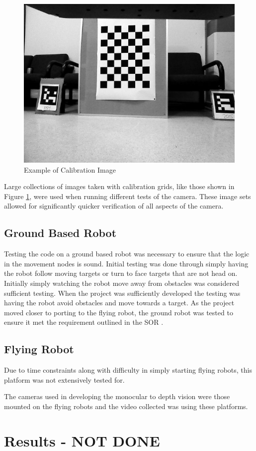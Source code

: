 \documentclass{article}[12]
\begin{document}
	\begin{figure}[]
		\centering
		\includegraphics[width=0.5\linewidth]{calibration}
		\caption{Example of Calibration Image}
		\label{fig:calbcalbcalb}
	\end{figure}
	
	Large collections of images taken with calibration grids, like those shown in Figure \ref{fig:calbcalbcalb}, were used when running different tests of the camera. These image sets allowed for significantly quicker verification of all aspects of the camera.
	
	\subsection{Ground Based Robot}
	
	Testing the code on a ground based robot was necessary to ensure that the logic in the movement nodes is sound. Initial testing was done through simply having the robot follow moving targets or turn to face targets that are not head on. Initially simply watching the robot move away from obstacles was considered sufficient testing. When the project was sufficiently developed the testing was having the robot avoid obstacles and move towards a target. As the project moved closer to porting to the flying robot, the ground robot was tested to ensure it met the requirement outlined in the SOR \cite{sor}. 

	\subsection{Flying Robot}
	
	Due to time constraints along with difficulty in simply starting flying robots, this platform was not extensively tested for. 
	
	The cameras used in developing the monocular to depth vision were those mounted on the flying robots and the video collected was using these platforms. 

	
\section{Results - NOT DONE}
\end{document}
